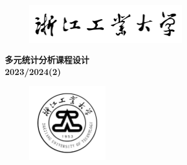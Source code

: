 \documentclass{article} %
\begin{document}
\begin{titlepage}
    \begin{center}
        \vspace{0.8cm}
        \begin{figure}[H]
            \centering
            \includegraphics[width=0.6\textwidth]{./img/校名.pdf}
          \end{figure} 
          \huge \textbf{多元统计分析课程设计} \\ 
          \large \textbf{2023/2024(2)}
          \vspace{0.4cm}
          \begin{figure}[H]
            \centering
            \includegraphics[width=0.3\textwidth]{./img/校徽.pdf}
          \end{figure}

          \vspace{1.2cm}


\end{center}
\end{titlepage}
\end{document}
